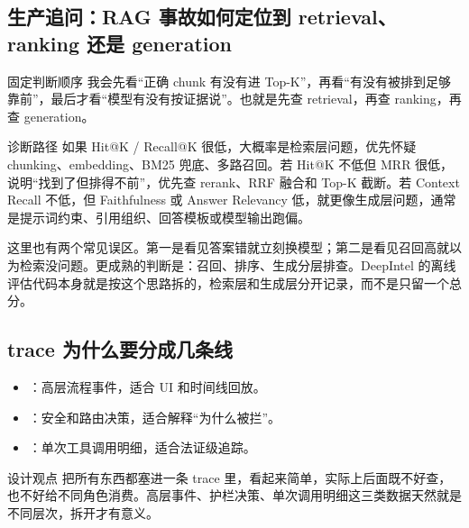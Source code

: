\documentclass[12pt]{article}
\begin{document}
\subsection{生产追问：RAG 事故如何定位到 retrieval、ranking 还是 generation}
\begin{qaBox}{固定判断顺序}
我会先看“正确 chunk 有没有进 Top-K”，再看“有没有被排到足够靠前”，最后才看“模型有没有按证据说”。也就是先查 retrieval，再查 ranking，再查 generation。
\end{qaBox}

\begin{analysisBox}{诊断路径}
如果 Hit@K / Recall@K 很低，大概率是检索层问题，优先怀疑 chunking、embedding、BM25 兜底、多路召回。若 Hit@K 不低但 MRR 很低，说明“找到了但排得不前”，优先查 rerank、RRF 融合和 Top-K 截断。若 Context Recall 不低，但 Faithfulness 或 Answer Relevancy 低，就更像生成层问题，通常是提示词约束、引用组织、回答模板或模型输出跑偏。

这里也有两个常见误区。第一是看见答案错就立刻换模型；第二是看见召回高就以为检索没问题。更成熟的判断是：召回、排序、生成分层排查。DeepIntel 的离线评估代码本身就是按这个思路拆的，检索层和生成层分开记录，而不是只留一个总分。
\end{analysisBox}

\subsection{trace 为什么要分成几条线}
\begin{itemize}[leftmargin=2em]
  \item {}：高层流程事件，适合 UI 和时间线回放。
  \item {}：安全和路由决策，适合解释“为什么被拦”。
  \item {}：单次工具调用明细，适合法证级追踪。
\end{itemize}

\begin{summaryBox}{设计观点}
把所有东西都塞进一条 trace 里，看起来简单，实际上后面既不好查，也不好给不同角色消费。高层事件、护栏决策、单次调用明细这三类数据天然就是不同层次，拆开才有意义。
\end{summaryBox}
\end{document}
